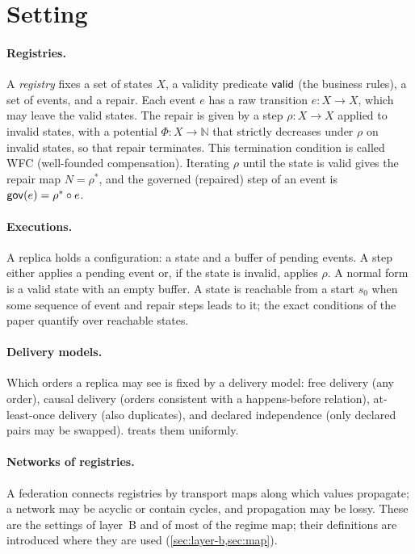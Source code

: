 
\section{Setting}\label{sec:setting}

\paragraph{Registries.} A \emph{registry} fixes a set of states $X$, a validity predicate $\mathsf{valid}$ (the
business rules), a set of events, and a repair. Each event $e$ has a raw transition $e : X \to X$, which may
leave the valid states. The repair is given by a step $\rho : X \to X$ applied to invalid states, with a
potential $\Phi : X \to \mathbb{N}$ that strictly decreases under $\rho$ on invalid states, so that repair
terminates. This termination condition is called WFC (well-founded compensation). Iterating $\rho$ until the state is valid gives the
repair map $N = \rho^{*}$, and the governed (repaired) step of an event is $\mathsf{gov}(e) = \rho^{*} \circ e$.

\paragraph{Executions.} A replica holds a configuration: a state and a buffer of pending events. A step
either applies a pending event or, if the state is invalid, applies $\rho$. A normal form is a valid state
with an empty buffer. A state is reachable from a start $s_0$ when some sequence of event and repair steps
leads to it; the exact conditions of the paper quantify over reachable states.

\paragraph{Delivery models.} Which orders a replica may see is fixed by a delivery model: free delivery
(any order), causal delivery (orders consistent with a happens-before relation), at-least-once delivery
(also duplicates), and declared independence (only declared pairs may be swapped). 
treats them uniformly.

\paragraph{Networks of registries.} A federation connects registries by transport maps along which values
propagate; a network may be acyclic or contain cycles, and propagation may be lossy. These are the
settings of layer~B and of most of the regime map; their definitions are introduced where they are used
(\cref{sec:layer-b,sec:map}).

